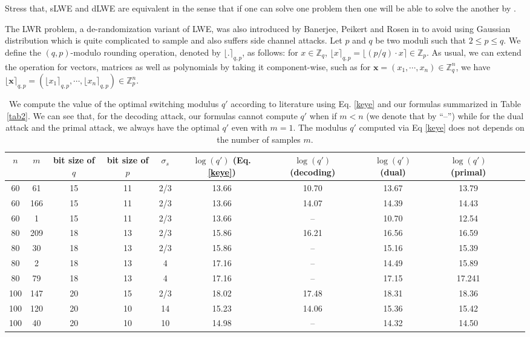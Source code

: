 \documentclass{cta-author}
\begin{document}
Stress that, sLWE and dLWE are equivalent in the sense that if one can solve one problem then one will be able to solve the another by \cite[Lemma 4.2]{Reg09}.


The LWR problem, a de-randomization variant of LWE, was also introduced by Banerjee, Peikert and Rosen in \cite{BPR12} to avoid using Gaussian distribution which is quite complicated to sample and also suffers side channel attacks.
Let $ p$ and $q $ be two moduli such that $2 \leq p \leq q $. We define the $(q,p)$-modulo rounding operation, denoted by $\lfloor. \rceil_{q,p}$, as follows: for $x \in \mathbb{Z}_q$, $\lfloor x \rceil_{q,p}=\lfloor (p/q)\cdot x \rceil \in \mathbb{Z}_p$. As usual, we can extend the operation for vectors, matrices as well as polynomials by taking it component-wise, such as for $\mathbf{x}=(x_{1},\cdots, x_{n}) \in \mathbb{Z}_q^n$, we have
$\lfloor \mathbf{x} \rceil_{q,p}=( \lfloor x_{1} \rceil_{q,p},\cdots,\lfloor x_{n} \rceil_{q,p})  \in \mathbb{Z}_p^n.$


\begin{table}[t]
	\caption{We compute the value of the optimal switching modulus $q'$ according to literature using Eq. \eqref{keye} and our formulas summarized in Table \ref{tab2}. We can see that, for the decoding  attack, our formulas cannot compute $q'$ when if $m<n$ (we denote that by ``--'') while for the dual attack and the primal attack, we always have the optimal $q'$ even with $m=1$. The modulus $q'$ computed via Eq \eqref{keye} does not depends on the number of samples $m$.}  
	\centering
	\small\addtolength{\tabcolsep}{0pt}
	
	\begin{tabular}{ c  c  c   c c c c  c c c c }
		\hline
		
		
		$n$& $m$& bit size of $q$ & bit size of $p$  & $\sigma_s$&$\log (q')$ (Eq. \eqref{keye}) &$\log (q')$ (decoding) &$\log (q')$ (dual) &$\log (q')$ (primal) \\
		\hline
		\hline
		60&61&15&11&2/3&13.66&10.70&13.67&13.79\\
		
		60&166&15&11&2/3&13.66&14.07&14.39& 14.43\\
		
		60& 1& 15& 11& 2/3& 13.66& --& 10.70& 12.54\\
		\hline
		80&209& 18& 13& 2/3& 15.86& 16.21& 16.56& 16.59\\
		80&30& 18& 13& 2/3& 15.86& --& 15.16& 15.39\\
		
		80& 2&18& 13& 4& 17.16& --&14.49& 15.89\\
		80&79& 18& 13& 4& 17.16& --& 17.15& 17.241\\
		\hline
		100& 147& 20& 15& 2/3& 18.02& 17.48& 18.31& 18.36\\
		100& 120& 20& 10& 14& 15.23& 14.06& 15.36& 15.42\\
		100& 40& 20& 10& 10& 14.98& --& 14.32& 14.50\\
		
		\hline
		
	\end{tabular}
	\label{table:7}
	
\end{table}
\end{document}
